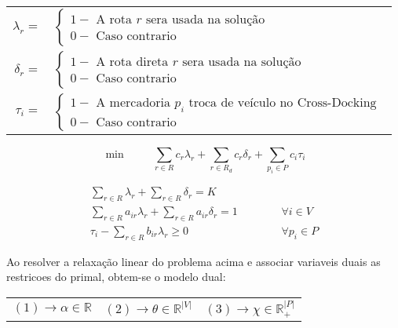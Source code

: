 \documentclass[12pt]{article}
\begin{document}
\begin{table}[!htb]
\begin{tabular}{rl}
\vspace{1mm}
$\lambda_r = $ &
$\left\{
\begin{array} {l}
1 - \textrm{ A rota } r \textrm{ sera usada na solu\c{c}\~ao} \\
0 - \textrm{ Caso contrario}
\end{array} \right.
$
\\
\vspace{1mm}
$\delta_r = $ &
$\left\{
\begin{array} {l}
1 - \textrm{ A rota direta } r \textrm{ sera usada na solu\c{c}\~ao} \\
0 - \textrm{ Caso contrario}
\end{array} \right.
$
\\
\vspace{1mm}
$\tau_i = $ &
$\left\{
\begin{array} {l}
1 - \textrm{ A mercadoria } p_i \textrm{ troca de ve\'iculo no Cross-Docking }\\
0 - \textrm{ Caso contrario }
\end{array} \right.
$
\end{tabular}
\end{table}

\[
\min \hspace{1cm} \sum\limits_{r \in R} {c_r \lambda_r} + \sum\limits_{r \in R_d} {c_r \delta_r} + \sum\limits_{p_i \in P} {c_i \tau_i}
\]

\begin{eqnarray}
\label{eqA1}
  \sum\limits_{r \in R} {\lambda_r} + \sum\limits_{r \in R} {\delta_r} = K \\
\label{eqA2}
  \sum\limits_{r \in R} {a_{ir} \lambda_r} + \sum\limits_{r \in R} {a_{ir} \delta_r} = 1 & \hspace{1cm} & \forall i \in V \\
\label{eqA3}
  \tau_i - \sum\limits_{r \in R} {b_{ir} \lambda_r} \ge 0 & \hspace{1cm} & \forall p_i \in P 
\end{eqnarray}

\vspace{3cm}

Ao resolver a relaxa\c{c}\~ao linear do problema acima e associar variaveis duais as restricoes do primal, obtem-se o modelo dual:
\begin{table}[!htb]
\begin{center}
\begin{tabular}{lll}
$(1) \rightarrow \alpha \in \mathbb{R}$ & $(2) \rightarrow \theta \in \mathbb{R}^{|V|}$ & $(3) \rightarrow \chi \in \mathbb{R}_+^{|P|}$ \\
\end{tabular}
\end{center}
\end{table}
\end{document}
